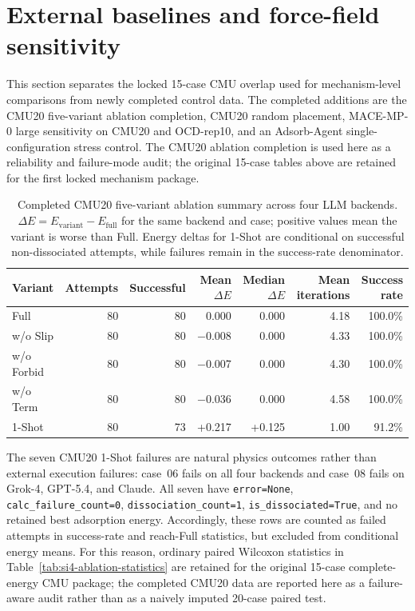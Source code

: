 \documentclass[%
 preprint,
 superscriptaddress,
 amsmath,amssymb,
 aps,
 prb,
 floatfix,
]{revtex4-2}
\begin{document}
\clearpage

\section{External baselines and force-field sensitivity}

This section separates the locked 15-case CMU overlap used for mechanism-level comparisons from newly completed control data.
The completed additions are the CMU20 five-variant ablation completion, CMU20 random placement, MACE-MP-0 large sensitivity on CMU20 and OCD-rep10, and an Adsorb-Agent single-configuration stress control.
The CMU20 ablation completion is used here as a reliability and failure-mode audit; the original 15-case tables above are retained for the first locked mechanism package.

\begin{table}[ht]
\centering
\scriptsize
\caption{Completed CMU20 five-variant ablation summary across four LLM backends. $\Delta E = E_{\mathrm{variant}} - E_{\mathrm{full}}$ for the same backend and case; positive values mean the variant is worse than Full. Energy deltas for 1-Shot are conditional on successful non-dissociated attempts, while failures remain in the success-rate denominator.}
\label{tab:si-cmu20-ablation-completion}
\begin{tabular}{lrrrrrr}
\toprule
Variant & Attempts & Successful & Mean $\Delta E$ & Median $\Delta E$ & Mean iterations & Success rate \\
\midrule
Full & 80 & 80 & 0.000 & 0.000 & 4.18 & 100.0\% \\
w/o Slip & 80 & 80 & $-$0.008 & 0.000 & 4.33 & 100.0\% \\
w/o Forbid & 80 & 80 & $-$0.007 & 0.000 & 4.30 & 100.0\% \\
w/o Term & 80 & 80 & $-$0.036 & 0.000 & 4.58 & 100.0\% \\
1-Shot & 80 & 73 & +0.217 & +0.125 & 1.00 & 91.2\% \\
\bottomrule
\end{tabular}
\end{table}

The seven CMU20 1-Shot failures are natural physics outcomes rather than external execution failures: case~06 fails on all four backends and case~08 fails on Grok-4, GPT-5.4, and Claude.
All seven have \texttt{error=None}, \texttt{calc\_failure\_count=0}, \texttt{dissociation\_count=1}, \texttt{is\_dissociated=True}, and no retained best adsorption energy.
Accordingly, these rows are counted as failed attempts in success-rate and reach-Full statistics, but excluded from conditional energy means.
For this reason, ordinary paired Wilcoxon statistics in Table~\ref{tab:si4-ablation-statistics} are retained for the original 15-case complete-energy CMU package; the completed CMU20 data are reported here as a failure-aware audit rather than as a naively imputed 20-case paired test.
\end{document}
